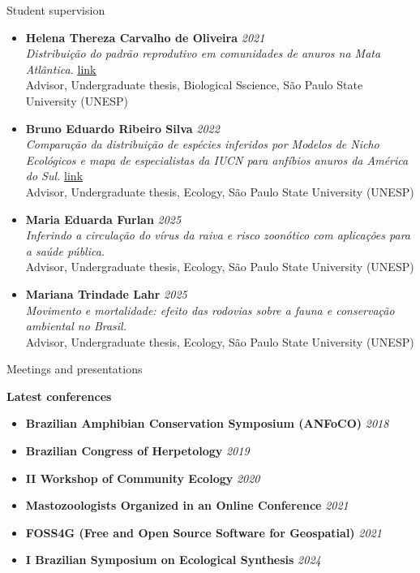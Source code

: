 \documentclass{resume}
\begin{document}
\begin{rSection}{Student supervision}
\begin{itemize}
\item {\bf Helena Thereza Carvalho de Oliveira} \hfill{\em 2021}\\
{\it Distribuição do padrão reprodutivo em comunidades de anuros na Mata Atlântica.} \href{https://repositorio.unesp.br/items/c8b867f6-4fd0-4e07-853a-abbf74d64c23}{\underline{link}}\\
Advisor, Undergraduate thesis, Biological Sscience, São Paulo State University (UNESP)

\item {\bf Bruno Eduardo Ribeiro Silva} \hfill{\em 2022}\\
{\it Comparação da distribuição de espécies inferidos por Modelos de Nicho Ecológicos e mapa de especialistas da IUCN para anfíbios anuros da América do Sul.} \href{https://repositorio.unesp.br/items/190f34f7-f0a7-4458-9dfc-ef8890bf0ca2}{\underline{link}}\\
Advisor, Undergraduate thesis, Ecology, São Paulo State University (UNESP)

\item {\bf Maria Eduarda Furlan} \hfill{\em 2025}\\
{\it Inferindo a circulação do vírus da raiva e risco zoonótico com aplicações para a saúde pública.}\\
Advisor, Undergraduate thesis, Ecology, São Paulo State University (UNESP)

\item {\bf Mariana Trindade Lahr} \hfill{\em 2025}\\
{\it Movimento e mortalidade: efeito das rodovias sobre a fauna e conservação ambiental no Brasil.}\\
Advisor, Undergraduate thesis, Ecology, São Paulo State University (UNESP)
\end{itemize}
\end{rSection}


\begin{rSection}{Meetings and presentations}

{\bf Latest conferences}
\begin{itemize}
\item {\bf Brazilian Amphibian Conservation Symposium (ANFoCO)} \hfill{\em 2018}
\item {\bf Brazilian Congress of Herpetology} \hfill{\em 2019}
\item {\bf II Workshop of Community Ecology} \hfill{\em 2020}
\item {\bf Mastozoologists Organized in an Online Conference} \hfill{\em 2021}
\item {\bf FOSS4G (Free and Open Source Software for Geospatial)} \hfill{\em 2021}
\item {\bf I Brazilian Symposium on Ecological Synthesis} \hfill{\em 2024}
\end{itemize}

\end{rSection}
\end{document}
